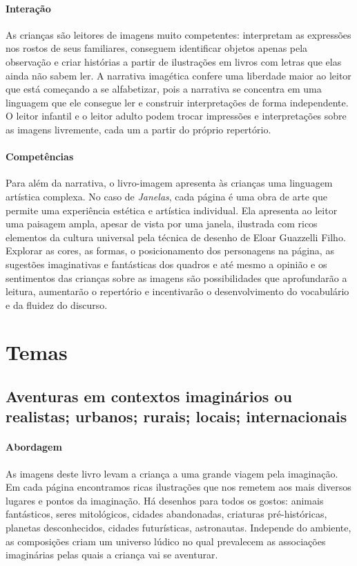 \documentclass[11pt]{extarticle}
\begin{document}
\paragraph{Interação} As crianças são leitores de imagens 
muito competentes: interpretam as expressões nos rostos de seus familiares, 
conseguem identificar objetos apenas pela observação e criar histórias a partir 
de ilustrações em livros com letras que elas ainda não sabem ler. A narrativa imagética 
confere uma liberdade maior ao leitor que está começando a se alfabetizar, pois a narrativa se concentra em uma linguagem que ele consegue ler e construir interpretações de forma 
independente. O leitor infantil e o leitor adulto podem trocar impressões e 
interpretações sobre as imagens livremente, cada um a partir do 
próprio repertório.

\paragraph{Competências} 
Para além da narrativa, o livro-imagem 
apresenta às crianças uma linguagem artística complexa. No caso de 
\textit{Janelas}, cada página é uma obra de arte que permite 
uma experiência estética e artística individual. Ela apresenta ao leitor 
uma paisagem ampla, apesar de vista por uma janela, ilustrada com ricos elementos da cultura universal pela técnica de desenho de 
Eloar Guazzelli Filho. Explorar as cores, as formas, o posicionamento dos personagens 
na página, as sugestões imaginativas e fantásticas dos quadros e até mesmo a opinião e os sentimentos das crianças sobre as imagens 
são possibilidades que aprofundarão a leitura, aumentarão o repertório 
e incentivarão o desenvolvimento do vocabulário e da fluidez do discurso. 



\section{Temas}

\subsection{Aventuras em contextos imaginários ou realistas; urbanos; rurais; locais; internacionais}

\paragraph{Abordagem} As imagens deste livro levam a criança a uma grande viagem pela imaginação. Em cada página encontramos ricas ilustrações que nos remetem aos mais diversos lugares e pontos da imaginação. Há desenhos para todos os gostos: animais fantásticos, seres mitológicos, cidades abandonadas, criaturas pré-históricas, planetas desconhecidos, cidades futurísticas, astronautas. Independe do ambiente, as composições criam um universo lúdico no qual prevalecem as associações imaginárias pelas quais a criança vai se aventurar.
\end{document}
